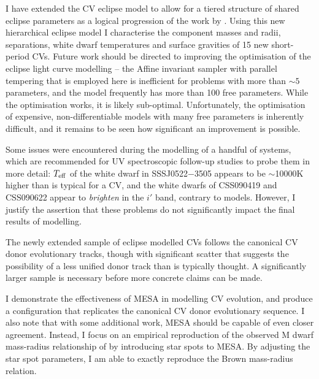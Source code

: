 \label{chpt:conclusion} %

I have extended the CV eclipse model to allow for a tiered structure of shared eclipse parameters as a logical progression of the work by \citet{McallisterThesis}.
Using this new hierarchical eclipse model I characterise the component masses and radii, separations, white dwarf temperatures and surface gravities of 15 new short-period CVs.
Future work should be directed to improving the optimisation of the eclipse light curve modelling -- the Affine invariant sampler with parallel tempering that is employed here is inefficient for problems with more than $\sim5$ parameters, and the model frequently has more than 100 free parameters.
While the optimisation works, it is likely sub-optimal. Unfortunately, the optimisation of expensive, non-differentiable models with many free parameters is inherently difficult, and it remains to be seen how significant an improvement is possible.

Some issues were encountered during the modelling of a handful of systems, which are recommended for UV spectroscopic follow-up studies to probe them in more detail: $T_{\rm eff}$ of the white dwarf in SSSJ0522$-$3505 appears to be $\sim$10000K higher than is typical for a CV, and the white dwarfs of CSS090419 and CSS090622 appear to \textit{brighten} in the $i'$ band, contrary to models.
However, I justify the assertion that these problems do not significantly impact the final results of modelling.

The newly extended sample of eclipse modelled CVs follows the canonical CV donor evolutionary tracks, though with significant scatter that suggests the possibility of a less unified donor track than is typically thought. A significantly larger sample is necessary before more concrete claims can be made.

I demonstrate the effectiveness of MESA in modelling CV evolution, and produce a configuration that replicates the canonical CV donor evolutionary sequence. I also note that with some additional work, MESA should be capable of even closer agreement.
Instead, I focus on an empirical reproduction of the observed M dwarf mass-radius relationship of \citet{brown2022} by introducing star spots to MESA. By adjusting the star spot parameters, I am able to exactly reproduce the Brown mass-radius relation.

